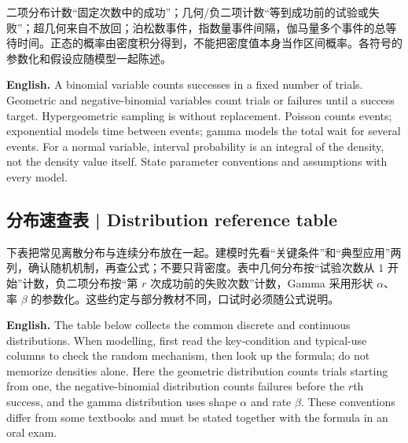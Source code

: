 \documentclass[UTF8,11pt,a4paper]{ctexart}
\newcommand{\EN}[1]{\par\noindent\textbf{English.} #1\par}
\begin{document}
二项分布计数“固定次数中的成功”；几何/负二项计数“等到成功前的试验或失败”；超几何来自不放回；泊松数事件，指数量事件间隔，伽马量多个事件的总等待时间。正态的概率由密度积分得到，不能把密度值本身当作区间概率。各符号的参数化和假设应随模型一起陈述。
\EN{A binomial variable counts successes in a fixed number of trials. Geometric and negative-binomial variables count trials or failures until a success target. Hypergeometric sampling is without replacement. Poisson counts events; exponential models time between events; gamma models the total wait for several events. For a normal variable, interval probability is an integral of the density, not the density value itself. State parameter conventions and assumptions with every model.}

\subsection{分布速查表 | Distribution reference table}
\noindent 下表把常见离散分布与连续分布放在一起。建模时先看“关键条件”和“典型应用”两列，确认随机机制，再查公式；不要只背密度。表中几何分布按“试验次数从 $1$ 开始”计数，负二项分布按“第 $r$ 次成功前的失败次数”计数，Gamma 采用形状 $\alpha$、率 $\beta$ 的参数化。这些约定与部分教材不同，口试时必须随公式说明。
\EN{The table below collects the common discrete and continuous distributions. When modelling, first read the key-condition and typical-use columns to check the random mechanism, then look up the formula; do not memorize densities alone. Here the geometric distribution counts trials starting from one, the negative-binomial distribution counts failures before the $r$th success, and the gamma distribution uses shape $\alpha$ and rate $\beta$. These conventions differ from some textbooks and must be stated together with the formula in an oral exam.}
\end{document}
